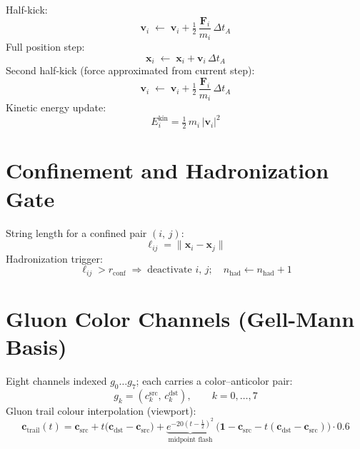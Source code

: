 \documentclass[10pt, a4paper, oneside]{article}
\begin{document}
Half-kick:
\begin{equation}
  \mathbf{v}_i \;\leftarrow\; \mathbf{v}_i + \tfrac{1}{2}\,\frac{\mathbf{F}_i}{m_i}\,\Delta t_A
\end{equation}
Full position step:
\begin{equation}
  \mathbf{x}_i \;\leftarrow\; \mathbf{x}_i + \mathbf{v}_i\,\Delta t_A
\end{equation}
Second half-kick (force approximated from current step):
\begin{equation}
  \mathbf{v}_i \;\leftarrow\; \mathbf{v}_i + \tfrac{1}{2}\,\frac{\mathbf{F}_i}{m_i}\,\Delta t_A
\end{equation}
Kinetic energy update:
\begin{equation}
  E_i^{\mathrm{kin}} = \tfrac{1}{2}\,m_i\,|\mathbf{v}_i|^2
\end{equation}

\section{Confinement and Hadronization Gate}

String length for a confined pair $(i,\,j)$:
\begin{equation}
  \ell_{ij} = \|\mathbf{x}_i - \mathbf{x}_j\|
\end{equation}
Hadronization trigger:
\begin{equation}
  \ell_{ij} > r_{\mathrm{conf}} \;\Longrightarrow\;
  \text{deactivate } i,\,j;\quad n_{\mathrm{had}} \leftarrow n_{\mathrm{had}} + 1
\end{equation}

\section{Gluon Color Channels (Gell-Mann Basis)}

Eight channels indexed $g_0 \ldots g_7$; each carries a color--anticolor pair:
\begin{equation}
  g_k = (c_k^{\mathrm{src}},\, c_k^{\mathrm{dst}}),
  \qquad k = 0,\ldots,7
\end{equation}
Gluon trail colour interpolation (viewport):
\begin{equation}
  \mathbf{c}_{\mathrm{trail}}(t) =
  \mathbf{c}_{\mathrm{src}} + t\bigl(\mathbf{c}_{\mathrm{dst}}-\mathbf{c}_{\mathrm{src}}\bigr)
  + \underbrace{e^{-20(t-\tfrac{1}{2})^2}}_{\text{midpoint flash}}\,
    \bigl(\mathbf{1}-\mathbf{c}_{\mathrm{src}} - t(\mathbf{c}_{\mathrm{dst}}-\mathbf{c}_{\mathrm{src}})\bigr)\cdot 0.6
\end{equation}
\end{document}
